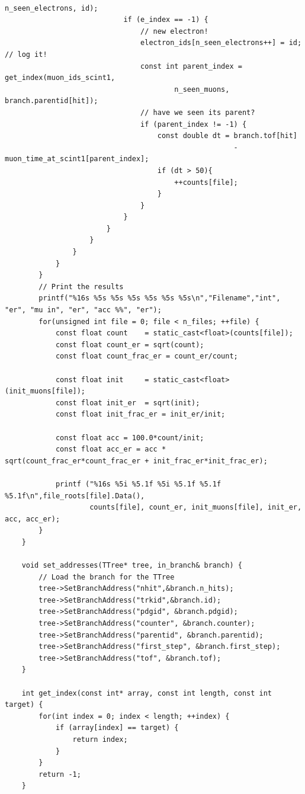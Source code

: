 \documentclass[]{article}
\begin{document}
\begin{verbatim}
                                                          n_seen_electrons, id);
                            if (e_index == -1) {
                                // new electron!
                                electron_ids[n_seen_electrons++] = id; // log it!
                                const int parent_index = get_index(muon_ids_scint1,
                                        n_seen_muons, branch.parentid[hit]);
                                // have we seen its parent?
                                if (parent_index != -1) {
                                    const double dt = branch.tof[hit] 
                                                      - muon_time_at_scint1[parent_index];
                                    if (dt > 50){
                                        ++counts[file];
                                    }
                                }
                            }
                        }
                    }
                }
            }
        }
        // Print the results
        printf("%16s %5s %5s %5s %5s %5s %5s\n","Filename","int", "er", "mu in", "er", "acc %%", "er");
        for(unsigned int file = 0; file < n_files; ++file) {
            const float count    = static_cast<float>(counts[file]);
            const float count_er = sqrt(count);
            const float count_frac_er = count_er/count;

            const float init     = static_cast<float>(init_muons[file]);
            const float init_er  = sqrt(init);
            const float init_frac_er = init_er/init;

            const float acc = 100.0*count/init;
            const float acc_er = acc * sqrt(count_frac_er*count_frac_er + init_frac_er*init_frac_er);

            printf ("%16s %5i %5.1f %5i %5.1f %5.1f %5.1f\n",file_roots[file].Data(), 
                    counts[file], count_er, init_muons[file], init_er, acc, acc_er);
        }
    }

    void set_addresses(TTree* tree, in_branch& branch) {
        // Load the branch for the TTree
        tree->SetBranchAddress("nhit",&branch.n_hits);
        tree->SetBranchAddress("trkid",&branch.id);
        tree->SetBranchAddress("pdgid", &branch.pdgid);
        tree->SetBranchAddress("counter", &branch.counter);
        tree->SetBranchAddress("parentid", &branch.parentid);
        tree->SetBranchAddress("first_step", &branch.first_step);
        tree->SetBranchAddress("tof", &branch.tof);
    }

    int get_index(const int* array, const int length, const int target) {
        for(int index = 0; index < length; ++index) {
            if (array[index] == target) {
                return index;
            }
        }
        return -1;
    }
\end{verbatim}
\end{document}

